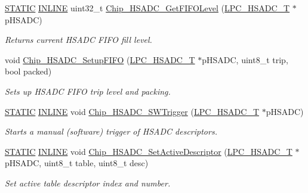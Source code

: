 \begin{DoxyCompactItemize}
\hyperlink{group___l_p_c___types___public___macros_ga10b2d890d871e1489bb02b7e70d9bdfb}{S\+T\+A\+T\+IC} \hyperlink{spifi__18xx__43xx_8h_a2eb6f9e0395b47b8d5e3eeae4fe0c116}{I\+N\+L\+I\+NE} uint32\+\_\+t \hyperlink{group___h_s_a_d_c__18_x_x__43_x_x_ga217f6d1396eb48c4a17232b837fda910}{Chip\+\_\+\+H\+S\+A\+D\+C\+\_\+\+Get\+F\+I\+F\+O\+Level} (\hyperlink{struct_l_p_c___h_s_a_d_c___t}{L\+P\+C\+\_\+\+H\+S\+A\+D\+C\+\_\+T} $\ast$p\+H\+S\+A\+DC)
\begin{DoxyCompactList}\small\item\em Returns current H\+S\+A\+DC F\+I\+FO fill level. \end{DoxyCompactList}\item 
void \hyperlink{group___h_s_a_d_c__18_x_x__43_x_x_gaafa52aef03cf64be7d329895ad90ac40}{Chip\+\_\+\+H\+S\+A\+D\+C\+\_\+\+Setup\+F\+I\+FO} (\hyperlink{struct_l_p_c___h_s_a_d_c___t}{L\+P\+C\+\_\+\+H\+S\+A\+D\+C\+\_\+T} $\ast$p\+H\+S\+A\+DC, uint8\+\_\+t trip, bool packed)
\begin{DoxyCompactList}\small\item\em Sets up H\+S\+A\+DC F\+I\+FO trip level and packing. \end{DoxyCompactList}\item 
\hyperlink{group___l_p_c___types___public___macros_ga10b2d890d871e1489bb02b7e70d9bdfb}{S\+T\+A\+T\+IC} \hyperlink{spifi__18xx__43xx_8h_a2eb6f9e0395b47b8d5e3eeae4fe0c116}{I\+N\+L\+I\+NE} void \hyperlink{group___h_s_a_d_c__18_x_x__43_x_x_gace987c7627a672a963e26ecdf03b1dda}{Chip\+\_\+\+H\+S\+A\+D\+C\+\_\+\+S\+W\+Trigger} (\hyperlink{struct_l_p_c___h_s_a_d_c___t}{L\+P\+C\+\_\+\+H\+S\+A\+D\+C\+\_\+T} $\ast$p\+H\+S\+A\+DC)
\begin{DoxyCompactList}\small\item\em Starts a manual (software) trigger of H\+S\+A\+DC descriptors. \end{DoxyCompactList}\item 
\hyperlink{group___l_p_c___types___public___macros_ga10b2d890d871e1489bb02b7e70d9bdfb}{S\+T\+A\+T\+IC} \hyperlink{spifi__18xx__43xx_8h_a2eb6f9e0395b47b8d5e3eeae4fe0c116}{I\+N\+L\+I\+NE} void \hyperlink{group___h_s_a_d_c__18_x_x__43_x_x_gaebc1767d0184f03d21ecaf84510b81f9}{Chip\+\_\+\+H\+S\+A\+D\+C\+\_\+\+Set\+Active\+Descriptor} (\hyperlink{struct_l_p_c___h_s_a_d_c___t}{L\+P\+C\+\_\+\+H\+S\+A\+D\+C\+\_\+T} $\ast$p\+H\+S\+A\+DC, uint8\+\_\+t table, uint8\+\_\+t desc)
\begin{DoxyCompactList}\small\item\em Set active table descriptor index and number. \end{DoxyCompactList}\item 

\end{DoxyCompactItemize}
